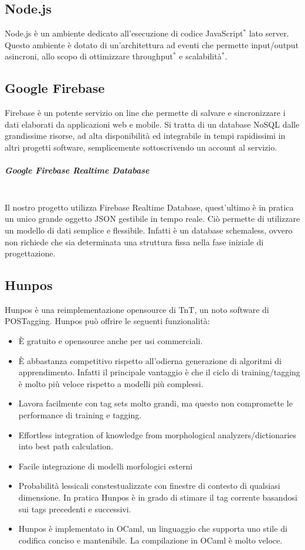 \subsection{Node.js}
Node.js è un ambiente dedicato all'esecuzione di codice JavaScript$^*$ lato server. Questo ambiente è dotato di un'architettura ad eventi che permette input/output asincroni, allo scopo di ottimizzare throughput$^*$ e scalabilità$^*$.
\subsection{Google Firebase}
Firebase è un potente servizio on line che permette di salvare e sincronizzare i dati elaborati da applicazioni web e mobile. Si tratta di un database NoSQL dalle grandissime risorse, ad alta disponibilità ed integrabile in tempi rapidissimi in altri progetti software, semplicemente sottoscrivendo un account al servizio.

\subparagraph{Google Firebase Realtime Database}
 \noindent \\Il nostro progetto utilizza Firebase Realtime Database, quest'ultimo è in pratica un unico grande oggetto JSON gestibile in tempo reale. Ciò permette di utilizzare un modello di dati semplice e flessibile. Infatti è un database schemaless, ovvero non richiede che sia determinata una struttura fissa nella fase iniziale di progettazione. 
\subsection{Hunpos}
Hunpos è una reimplementazione opensource di TnT, un noto software di POSTagging.
Hunpos può offrire le seguenti funzionalità:
\begin{itemize}
\item È gratuito e opensource anche per usi commerciali.

\item È abbastanza competitivo rispetto all'odierna generazione di algoritmi di apprendimento. Infatti il principale vantaggio è che il ciclo di training/tagging è molto più veloce rispetto a modelli più complessi.

\item Lavora facilmente con tag sets molto grandi,
ma questo non compromette le performance di training e tagging.

\item Effortless integration of knowledge from morphological analyzers/dictionaries into best path calculation.

\item Facile integrazione di modelli morfologici esterni

\item Probabilità lessicali constestualizzate con finestre di contesto di qualsiasi dimensione. In pratica Hunpos è in grado di stimare il tag corrente basandosi sui tags precedenti e successivi.

\item Hunpos è implementato in OCaml, un linguaggio che supporta uno stile di codifica conciso e mantenibile. La compilazione in OCaml è molto veloce.
\end{itemize}
